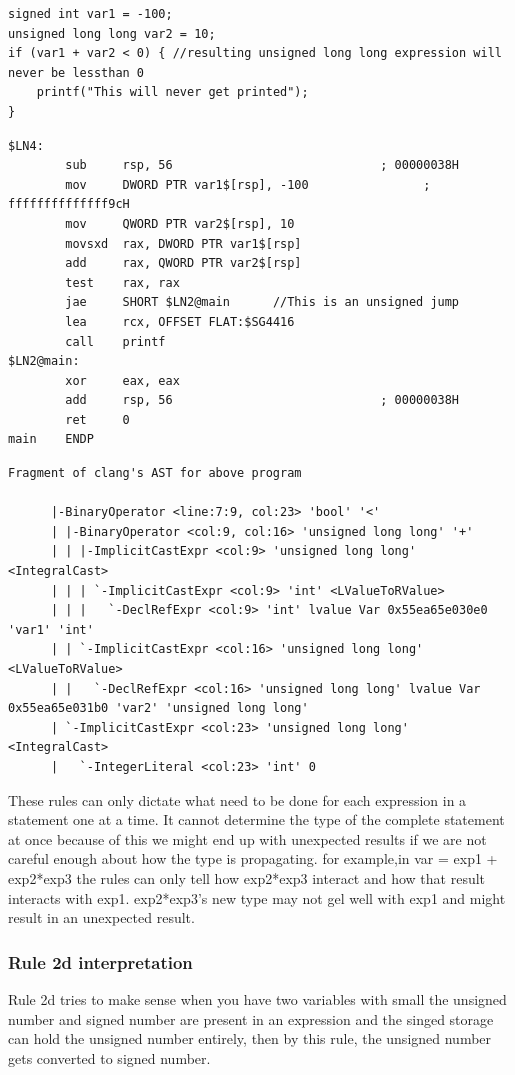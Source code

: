 \documentclass{article}
\begin{document}
\begin{verbatim}
signed int var1 = -100;
unsigned long long var2 = 10;
if (var1 + var2 < 0) { //resulting unsigned long long expression will never be lessthan 0
    printf("This will never get printed");
}
\end{verbatim}
\begin{verbatim}
$LN4:
        sub     rsp, 56                             ; 00000038H
        mov     DWORD PTR var1$[rsp], -100                ; ffffffffffffff9cH
        mov     QWORD PTR var2$[rsp], 10
        movsxd  rax, DWORD PTR var1$[rsp]
        add     rax, QWORD PTR var2$[rsp]
        test    rax, rax
        jae     SHORT $LN2@main      //This is an unsigned jump
        lea     rcx, OFFSET FLAT:$SG4416
        call    printf
$LN2@main:
        xor     eax, eax
        add     rsp, 56                             ; 00000038H
        ret     0
main    ENDP
\end{verbatim}
\begin{verbatim}
Fragment of clang's AST for above program

      |-BinaryOperator <line:7:9, col:23> 'bool' '<'
      | |-BinaryOperator <col:9, col:16> 'unsigned long long' '+'
      | | |-ImplicitCastExpr <col:9> 'unsigned long long' <IntegralCast>
      | | | `-ImplicitCastExpr <col:9> 'int' <LValueToRValue>
      | | |   `-DeclRefExpr <col:9> 'int' lvalue Var 0x55ea65e030e0 'var1' 'int'
      | | `-ImplicitCastExpr <col:16> 'unsigned long long' <LValueToRValue>
      | |   `-DeclRefExpr <col:16> 'unsigned long long' lvalue Var 0x55ea65e031b0 'var2' 'unsigned long long'
      | `-ImplicitCastExpr <col:23> 'unsigned long long' <IntegralCast>
      |   `-IntegerLiteral <col:23> 'int' 0
\end{verbatim}


These rules can only dictate what need to be done for each expression in a
statement one at a time. It cannot determine the type of the complete
statement at once because of this we might end up with unexpected results if
we are not careful enough about how the type is propagating.
for example,in var = exp1 + exp2*exp3 the rules can only tell how exp2*exp3
interact and how that result interacts with exp1. exp2*exp3's new type may not
gel well with exp1 and might result in an unexpected result.

\subsubsection{Rule 2d interpretation}
Rule 2d tries to make sense when you have two variables with small
the unsigned number and signed number are present in an expression and the
singed storage can hold the unsigned number entirely, then by this
rule, the unsigned number gets converted to signed number.
\end{document}
